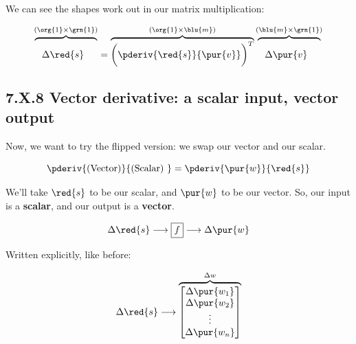         We can see the shapes work out in our matrix multiplication:
        
        \begin{equation}
            \overbrace{
                \phantom{\bigg(}
                    \Delta \red{s}
                \phantom{\bigg)^T}
            }^{ (\org{1} \times \grn{1}) }
            =
            \overbrace{
                \bigg(
                    \pderiv{\red{s}}{\pur{v}}
                \bigg)^T
            }^{ (\org{1} \times \blu{m}) }
            \overbrace{
                \phantom{\bigg(}
                    \Delta \pur{v}
                \phantom{\bigg)^T}
            }^{ (\blu{m} \times \grn{1}) }
        \end{equation}
        
    \secdiv
    
    \subsection*{7.X.8 \quad Vector derivative: a scalar input, vector output}
    
        Now, we want to try the flipped version: we swap our vector and our scalar.
        
        \begin{equation}
            \pderiv{ \text{(Vector)} } { \text{(Scalar) } }
            =
            \pderiv{ \pur{w} }{ \red{s} } 
        \end{equation}
        
        We'll take $\red{s}$ to be our scalar, and $\pur{w}$ to be our vector. So, our input is a \textbf{scalar}, and our output is a \textbf{vector}.
        
        \begin{equation}
            \Delta \red{s}
            \longrightarrow
            \boxed{f}
            \longrightarrow
            \Delta \pur{w}
        \end{equation}
        
        Written explicitly, like before:
        
        \begin{equation}
            \Delta \red{s}
            \longrightarrow 
            \overbrace{
                \begin{bmatrix}
                    \Delta \pur{w_1}\\ \Delta \pur{w_2}\\ \vdots \\ \Delta \pur{w_n}
                \end{bmatrix}
            }^{\Delta w}
        \end{equation}
        
